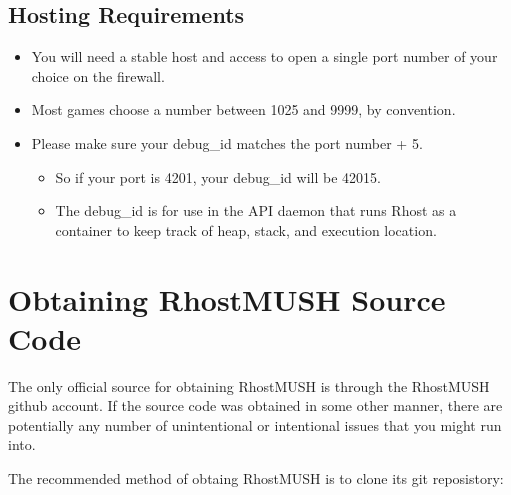 \documentclass[letterpaper,10pt,english]{sphinxmanual}
\begin{document}
\subsection{Hosting Requirements}
\label{\detokenize{install:hosting-requirements}}\label{\detokenize{install:id5}}\begin{itemize}
\item {} 
\sphinxAtStartPar
You will need a stable host and access to open a single port number of your choice on the firewall.

\item {} 
\sphinxAtStartPar
Most games choose a number between 1025 and 9999, by convention.

\item {} 
\sphinxAtStartPar
Please make sure your debug\_id matches the port number + 5.
\begin{itemize}
\item {} 
\sphinxAtStartPar
So if your port is 4201, your debug\_id will be 42015.

\item {} 
\sphinxAtStartPar
The debug\_id is for use in the API daemon that runs Rhost as a container to keep track of heap, stack, and execution location.

\end{itemize}

\end{itemize}


\section{Obtaining RhostMUSH Source Code}
\label{\detokenize{install:obtaining-rhostmush-source-code}}\label{\detokenize{install:obtaining-rhostmush}}
\sphinxAtStartPar
The only official source for obtaining RhostMUSH is through the \textquotesingle{}RhostMUSH\textquotesingle{}
github account. If the source code was obtained in some other manner, there
are potentially any number of unintentional or intentional issues that you
might run into.

\sphinxAtStartPar
The recommended method of obtaing RhostMUSH is to clone it\textquotesingle{}s git reposistory:

\begin{sphinxVerbatim}[commandchars=\\\{\}]
   
\end{sphinxVerbatim}
\end{document}
